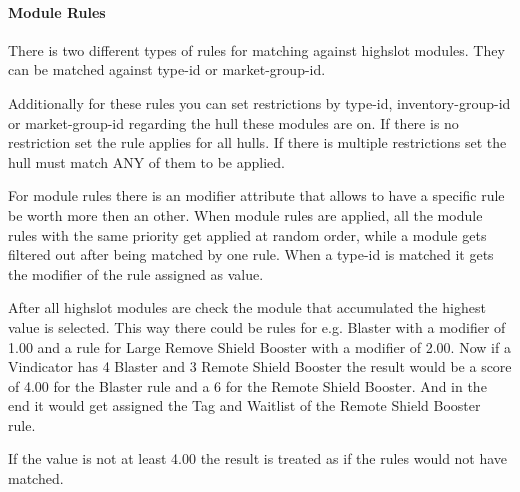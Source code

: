 \documentclass[oneside,a4paper]{article}
\begin{document}
\paragraph{Module Rules}\label{para:module_rules}
There is two different types of rules for matching against highslot modules.
They can be matched against type-id or market-group-id.

Additionally for these rules you can set restrictions by type-id, inventory-group-id or market-group-id regarding the hull these modules are on. If there is no restriction set the rule applies for all hulls.
If there is multiple restrictions set the hull must match ANY of them to be applied.

For module rules there is an modifier attribute that allows to have a specific rule be worth more then an other.
When module rules are applied, all the module rules with the same priority get applied at random order, while a module gets filtered out after being matched by one rule. When a type-id is matched it gets the modifier of the rule assigned as value.


After all highslot modules are check the module that accumulated the highest value is selected.
This way there could be rules for e.g. Blaster with a modifier of 1.00 and a rule for Large Remove Shield Booster with a modifier of 2.00. Now if a Vindicator has 4 Blaster and 3 Remote Shield Booster the result would be a score of 4.00 for the Blaster rule and a 6 for the Remote Shield Booster.
And in the end it would get assigned the Tag and Waitlist of the Remote Shield Booster rule.

If the value is not at least 4.00 the result is treated as if the rules would not have matched.
\end{document}
